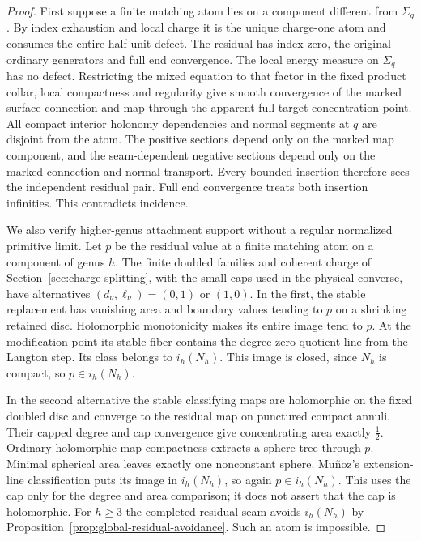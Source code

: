 \documentclass[11pt]{amsart}
\theoremstyle{definition}
\theoremstyle{remark}
\theoremstyle{plain}
\begin{document}
\begin{proof}
First suppose a finite matching atom lies on
a component different from $\Sigma_q$.
By index exhaustion and local charge it is the
unique charge-one atom and consumes the entire
half-unit defect. The residual has index zero,
the original ordinary generators and full end
convergence. The local energy measure on
$\Sigma_q$ has no defect. Restricting the mixed
equation to that factor in the fixed product
collar, local compactness and regularity give
smooth convergence of the marked surface
connection and map through the apparent
full-target concentration point.
All compact interior holonomy dependencies and
normal segments at $q$ are disjoint from the atom.
The positive sections depend only on the marked
map component, and the seam-dependent negative
sections depend only on the marked connection
and normal transport. Every bounded insertion
therefore sees the independent residual pair.
Full end convergence treats both insertion
infinities. This contradicts incidence.

We also verify higher-genus attachment support
without a regular normalized primitive limit.
Let $p$ be the residual value at a finite
matching atom on a component of genus $h$.
The finite doubled families and coherent
charge of Section~\ref{sec:charge-splitting},
with the small caps used in the physical
converse, have alternatives
$(d_\nu,\ell_\nu)=(0,1)$ or $(1,0)$.
In the first, the stable replacement has
vanishing area and boundary values tending
to $p$ on a shrinking retained disc.
Holomorphic monotonicity makes its entire
image tend to $p$. At the modification
point its stable fiber contains the
degree-zero quotient line from the Langton
step. Its class belongs to $i_h(N_h)$.
This image is closed, since $N_h$ is
compact, so $p\in i_h(N_h)$.

In the second alternative the stable
classifying maps are holomorphic on the
fixed doubled disc and converge to the
residual map on punctured compact annuli.
Their capped degree and cap convergence
give concentrating area exactly $\frac12$.
Ordinary holomorphic-map compactness
extracts a sphere tree through $p$.
Minimal spherical area leaves exactly
one nonconstant sphere. Mu\~noz's
extension-line classification puts its
image in $i_h(N_h)$, so again
$p\in i_h(N_h)$.
This uses the cap only for the degree
and area comparison; it does not assert
that the cap is holomorphic.
For $h\ge3$ the completed residual seam
avoids $i_h(N_h)$ by
Proposition~\ref{prop:global-residual-avoidance}.
Such an atom is impossible.


\end{proof}
\end{document}
